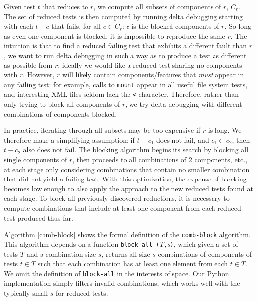 Given test $t$ that reduces to $r$, we compute all subsets of
components of $r$, $C_r$.  The set of reduced tests is then computed
by running delta debugging starting with each $t-c$ that fails, for all
$c \in C_r$: $c$ is the blocked components of $r$.  So long as even
one component is blocked, it is impossible to reproduce the same $r$.
The intuition is that to find a reduced failing test that exhibits a
different fault than $r$, we want to run delta debugging in such a way
as to produce a test as different as possible from $r$; ideally we
would like a reduced test sharing no components with $r$.  However,
$r$ will likely contain components/features \cite{ISSRE13} that \emph{must} appear in any failing
test: for example, calls to {\tt mount} appear in all useful file
system tests, and interesting XML files seldom lack the {\tt <}
character.  Therefore, rather than only trying to block all components of $r$,
we try delta debugging with different combinations of components blocked.

In practice, iterating through all subsets may be too expensive if $r$
is long.  We therefore make a simplifying assumption:  if $t-c_1$ does not fail,
and $c_1 \subset c_2$, then $t-c_2$ also does not fail.  The blocking
algorithm begins its search by blocking all single components of $r$,
then proceeds to all combinations of 2 components, etc., at each stage
only considering combinations that contain no smaller combination that did not
yield a failing test.  With this optimization, the expense of blocking
becomes low enough to also apply the approach to the new
reduced tests found at each stage.  To block all previously discovered
reductions, it is necessary to compute combinations that include at
least one component from each reduced test produced thus far.

Algorithm \ref{comb-block} shows
the formal definition of the {\tt comb-block} algorithm.  This algorithm depends on a
function {\tt block-all ($T$,$s$)}, which given a set of tests $T$ and
a combination size $s$,  returns all size $s$ combinations of components of tests $t
\in T$ such that each combination has at least one element
from each $t \in T$.  We omit the definition of {\tt block-all} in
the interests of space.  Our Python implementation \cite{tstl} simply
filters invalid combinations, which works well with the typically
small $s$ for reduced tests.

